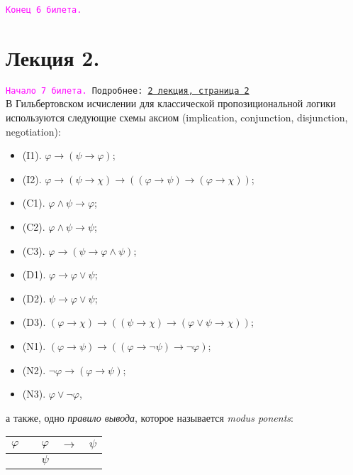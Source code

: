 \documentclass[a4paper,100pt]{article}
\theoremstyle{indented}
\theoremstyle{definition}
\theoremstyle{remark}
\begin{document}
\texttt{\textcolor{magenta}{Конец 6 билета.}} 

\hrulefill


\section{Лекция 2.}

\hrulefill

\texttt{\hypertarget{b7}{\textcolor{magenta}{Начало 7 билета.}} Подробнее: \href{http://www.mi-ras.ru/~speranski/courses/logic-1-2021-spring/slides_2.pdf}{2 лекция, страница 2}} \\

В Гильбертовском исчислении для классической пропозициональной логики используются следующие схемы аксиом (implication, conjunction, disjunction, negotiation): 

\begin{itemize}
  \item (I1). $\varphi\rightarrow (\psi\rightarrow \varphi)$;
  \item (I2). $\varphi\rightarrow (\psi\rightarrow \chi)\rightarrow((\varphi\rightarrow \psi)\rightarrow (\varphi\rightarrow \chi))$; 
  \item (C1). $\varphi \wedge \psi \rightarrow \varphi$; 
  \item (C2). $\varphi \wedge \psi \rightarrow \psi$; 
  \item (C3). $\varphi\rightarrow (\psi \rightarrow \varphi \wedge \psi)$;
  \item (D1). $\varphi\rightarrow \varphi \vee\psi$;
  \item (D2). $\psi\rightarrow \varphi \vee \psi$; 
  \item (D3). $(\varphi\rightarrow \chi)\rightarrow((\psi\rightarrow \chi)\rightarrow (\varphi\vee\psi\rightarrow\chi))$;
  \item (N1). $(\varphi\rightarrow \psi)\rightarrow((\varphi\rightarrow \neg \psi)\rightarrow \neg \varphi)$; 
  \item (N2). $\neg\varphi \rightarrow (\varphi\rightarrow \psi)$; 
  \item (N3). $\varphi \vee \neg \varphi$, 
\end{itemize}

а также, одно \textit{правило вывода}, которое называется \textit{modus ponents}:

\begin{center}
  \begin{tabular}{c c c c c}
    $\varphi$ & & $\varphi$ & $\rightarrow$ & $\psi$ \\ 
    \hline
    & & $\psi$ & & 
  \end{tabular}
\end{center}
\end{document}
